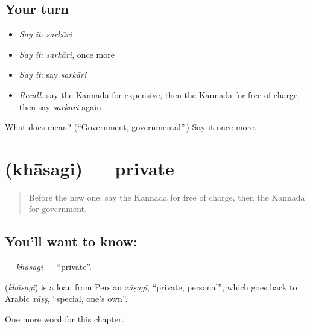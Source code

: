 \subsection*{Your turn}
\begin{itemize}
\raggedright
  \item \emph{Say it:} \emph{sarkāri}
  \item \emph{Say it:} \emph{sarkāri}, once more
  \item \emph{Say it:} say \emph{sarkāri}
  \item \emph{Recall:} say the Kannada for expensive, then the Kannada for free of charge, then say \emph{sarkāri} again
\end{itemize}

\begin{tcolorbox}[breakable,colback=teal!4,colframe=teal!35!black,title={Before you move on}]
What does  mean? (\textquotedblleft{}Government, governmental\textquotedblright{}.) Say it once more.
\end{tcolorbox}
\section[\texorpdfstring{\kn{ಖಾಸಗಿ} (khāsagi)}{ಖಾಸಗಿ (khāsagi)}]{ (khāsagi) — private}

\label{lesson:KA-C180-khasagi}



\begin{quote}
Before the new one: say the Kannada for free of charge, then the Kannada for government.
\end{quote}

\subsection*{You'll want to know: }
\textbf{} — \emph{khāsagi} — \textquotedblleft{}private\textquotedblright{}.

\begin{cousinweb}
\textbf{} (\emph{khāsagi}) is a loan from Persian \emph{xāṣagī}, \textquotedblleft{}private, personal\textquotedblright{}, which goes back to Arabic \emph{xāṣṣ}, \textquotedblleft{}special, one's own\textquotedblright{}.
\end{cousinweb}

\begin{grammarlens}[title={What you've built}]
One more word for this chapter.
\end{grammarlens}

